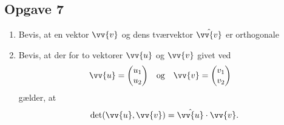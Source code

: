 \subsection*{Opgave 7}
\begin{enumerate}[label=\roman*)]
	\item Bevis, at en vektor $\vv{v}$ og dens tværvektor $\hat{\vv{v}}$ er orthogonale
	\item Bevis, at der for to vektorer $\vv{u}$ og $\vv{v}$ givet ved
	\begin{align*}
		&\vv{u} =
		\begin{pmatrix}
			u_1 \\ u_2
		\end{pmatrix}
		& 
		&\textnormal{og} 
		&
		&\vv{v} =
		\begin{pmatrix}
			v_1 \\ v_2
		\end{pmatrix}
	\end{align*}
	gælder, at
	\begin{align*}
		\det(\vv{u},\vv{v}) = \hat{\vv{u}}\cdot \vv{v}.
	\end{align*}
\end{enumerate}
